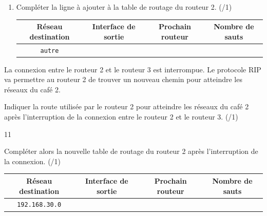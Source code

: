 \documentclass[a4paper,10pt]{report}
\renewcommand{\arraystretch}{1}  %
\begin{document}
\begin{enumerate}[resume]
    \item Compléter la ligne à ajouter à la table de routage du routeur 2. (/1)
    
    \renewcommand{\arraystretch}{1.5}
\begin{center}
    \begin{tabular}{|c|c|c|c|}
        \hline
        \textbf{Réseau destination} & \textbf{Interface de sortie} & \textbf{Prochain routeur} & \textbf{Nombre de sauts}\\
         
        \hline
        \verb|autre| &  &  &  \\ \hline
           \end{tabular}
\end{center}
\end{enumerate}

\medskip

La connexion entre le routeur 2 et le routeur 3 est interrompue. Le protocole RIP va permettre au routeur 2 de trouver un nouveau chemin pour atteindre les réseaux du café 2.

\begin{enumerate}[resume]
    
    \begin{minipage}{0.68\linewidth}
    \item Indiquer la route utilisée par le routeur 2 pour atteindre les réseaux du café 2 après l'interruption de la connexion entre le routeur 2 et le routeur 3. (/1)
\end{minipage}\hfill
    \begin{minipage}{0.28\linewidth}
        \begin{answer}{1}{1}    \end{answer}
\end{minipage}
    \item Compléter alors la nouvelle table de routage du routeur 2 après l'interruption de la connexion. (/1)
\renewcommand{\arraystretch}{1.5}
\begin{center}
    \begin{tabular}{|c|c|c|c|}
        \hline
        \textbf{Réseau destination} & \textbf{Interface de sortie} & \textbf{Prochain routeur} & \textbf{Nombre de sauts}\\
         
        \hline
        \verb|192.168.30.0| &  &  &  \\ \hline
           \end{tabular}
\end{center}    

\end{enumerate}
\end{document}
